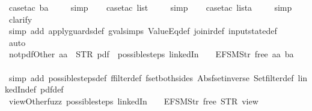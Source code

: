 \begin{isabellebody}
\ {\isacharparenleft}case{\isacharunderscore}tac\ ba{\isacharparenright}\isanewline
\ \ \ \isamarkupfalse%
\ simp\isanewline
\ \ \isamarkupfalse%
\ {\isacharparenleft}case{\isacharunderscore}tac\ list{\isacharparenright}\isanewline
\ \ \ \isamarkupfalse%
\ simp\isanewline
\ \ \isamarkupfalse%
\ {\isacharparenleft}case{\isacharunderscore}tac\ lista{\isacharparenright}\isanewline
\ \ \ \isamarkupfalse%
\ simp\isanewline
\ \ \isamarkupfalse%
\ clarify\isanewline
\ \ \isamarkupfalse%
\ {\isacharparenleft}simp\ add{\isacharcolon}\ apply{\isacharunderscore}guards{\isacharunderscore}def\ gval{\isachardot}simps\ ValueEq{\isacharunderscore}def\ join{\isacharunderscore}ir{\isacharunderscore}def\ input{}state{\isacharunderscore}def{\isacharparenright}\isanewline
\ \ \isamarkupfalse%
\ auto%
\endisatagproof
{\isafoldproof}%
%
\isadelimproof
\isanewline
%
\endisadelimproof
\isanewline
{}\isamarkupfalse%
\ not{\isacharunderscore}pdfOther{\isacharunderscore}{}{\isacharcolon}\ {\isachardoublequoteopen}aa\ {\isasymnoteq}\ STR\ {\isacharprime}{\isacharprime}pdf{\isacharprime}{\isacharprime}\ {\isasymLongrightarrow}\ possible{\isacharunderscore}steps\ linkedIn\ {}\ {\isacharless}{}\ {\isacharcolon}{\isacharequal}\ EFSM{\isachardot}Str\ {\isacharprime}{\isacharprime}free{\isacharprime}{\isacharprime}{\isachargreater}\ aa\ ba\ {\isacharequal}\ {\isacharbraceleft}{\isacharbar}{\isacharbar}{\isacharbraceright}{\isachardoublequoteclose}\isanewline
%
\isadelimproof
\ \ %
\endisadelimproof
%
\isatagproof
{}\isamarkupfalse%
\ {\isacharparenleft}simp\ add{\isacharcolon}\ possible{\isacharunderscore}steps{\isacharunderscore}def\ ffilter{\isacharunderscore}def\ fset{\isacharunderscore}both{\isacharunderscore}sides\ Abs{\isacharunderscore}fset{\isacharunderscore}inverse\ Set{\isachardot}filter{\isacharunderscore}def\ linkedIn{\isacharunderscore}def\ pdf{}{\isacharunderscore}def{\isacharparenright}%
\endisatagproof
{\isafoldproof}%
%
\isadelimproof
\isanewline
%
\endisadelimproof
\isanewline
{}\isamarkupfalse%
\ viewOther{\isacharunderscore}fuzz{\isacharcolon}\ {\isachardoublequoteopen}possible{\isacharunderscore}steps\ linkedIn\ {}\ {\isacharless}{}\ {\isacharcolon}{\isacharequal}\ EFSM{\isachardot}Str\ {\isacharprime}{\isacharprime}free{\isacharprime}{\isacharprime}{\isachargreater}\ STR\ {\isacharprime}{\isacharprime}view{\isacharprime}{\isacharprime}\isanewline

\end{isabellebody}
